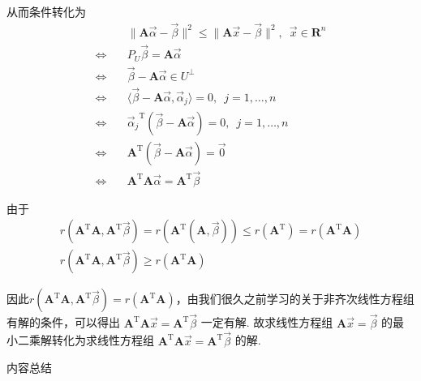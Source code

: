 从而条件转化为
\begin{align*}
               & \lVert \mathbf{A}\vec{\alpha} - \vec{\beta} \rVert^{2} \leqslant \lVert \mathbf{A}\vec{x} - \vec{\beta} \rVert^{2}, \enspace \vec{x} \in \mathbf{R}^{n} \\
    \iff \quad & P_U \vec{\beta} = \mathbf{A}\vec{\alpha}                                                                                                                \\
    \iff \quad & \vec{\beta} - \mathbf{A}\vec{\alpha} \in U^{\perp}                                                                                                      \\
    \iff \quad & \langle \vec{\beta} - \mathbf{A}\vec{\alpha}, \vec{\alpha} _j \rangle = 0, \enspace j = 1, \ldots , n                                                   \\
    \iff \quad & {\vec{\alpha} _j}^{\mathrm{T}}(\vec{\beta} - \mathbf{A}\vec{\alpha}) = 0, \enspace j = 1, \ldots , n                                                    \\
    \iff \quad & \mathbf{A}^{\mathrm{T}}(\vec{\beta} - \mathbf{A}\vec{\alpha}) = \vec{0}                                                                                 \\
    \iff \quad & \mathbf{A}^{\mathrm{T}}\mathbf{A}\vec{\alpha} = \mathbf{A}^{\mathrm{T}}\vec{\beta}
\end{align*}

由于
\begin{gather*}
    r(\mathbf{A}^{\mathrm{T}}\mathbf{A}, \mathbf{A}^{\mathrm{T}}\vec{\beta})= r (\mathbf{A}^{\mathrm{T}}(\mathbf{A}, \vec{\beta})) \leqslant r(\mathbf{A}^{\mathrm{T}}) = r(\mathbf{A}^{\mathrm{T}}\mathbf{A}) \\
    r(\mathbf{A}^{\mathrm{T}}\mathbf{A}, \mathbf{A}^{\mathrm{T}}\vec{\beta}) \geqslant r(\mathbf{A}^{\mathrm{T}}\mathbf{A})
\end{gather*}

因此$r(\mathbf{A}^{\mathrm{T}}\mathbf{A}, \mathbf{A}^{\mathrm{T}}\vec{\beta}) = r(\mathbf{A}^{\mathrm{T}}\mathbf{A})$，由我们很久之前学习的关于非齐次线性方程组有解的条件，可以得出 $ \mathbf{A}^{\mathrm{T}}\mathbf{A}\vec{x} = \mathbf{A}^{\mathrm{T}}\vec{\beta}$ 一定有解. 故求线性方程组 $\mathbf{A}\vec{x} = \vec{\beta}$ 的最小二乘解转化为求线性方程组 $ \mathbf{A}^{\mathrm{T}}\mathbf{A}\vec{x} = \mathbf{A}^{\mathrm{T}}\vec{\beta}$ 的解.

\vspace{2ex}
\centerline{\heiti \Large 内容总结}

